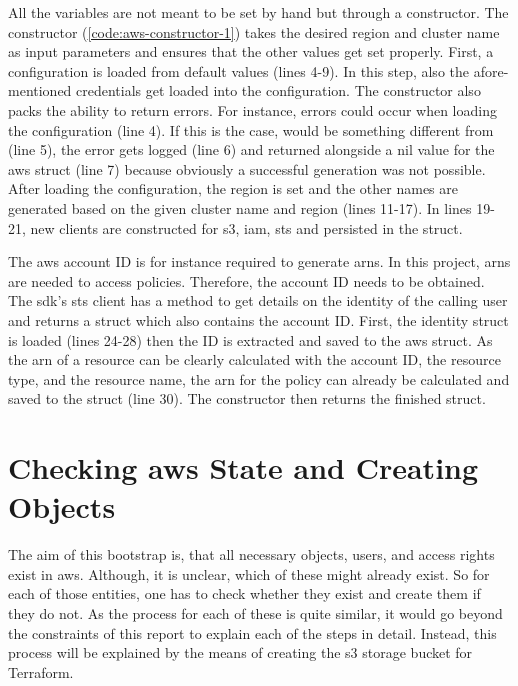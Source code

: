 

All the variables are not meant to be set by hand but through a constructor.
The constructor (\autoref{code:aws-constructor-1}) takes the desired region and cluster name as input parameters and ensures that the other values get set properly.
First, a configuration is loaded from default values (lines 4-9).
In this step, also the afore-mentioned credentials get loaded into the configuration.
The constructor also packs the ability to return errors.
For instance, errors could occur when loading the configuration (line 4).
If this is the case,  would be something different from  (line 5), the error gets logged (line 6) and returned alongside a nil value for the \ac{aws} struct (line 7) because obviously a successful generation was not possible.
After loading the configuration, the region is set and the other names are generated based on the given cluster name and region (lines 11-17).
In lines 19-21, new clients are constructed for \ac{s3}, \ac{iam}, \ac{sts} and persisted in the struct.

The \ac{aws} account ID is for instance required to generate \acp{arn}.
In this project, \acp{arn} are needed to access policies.
Therefore, the account ID needs to be obtained.
The \ac{sdk}'s \ac{sts} client has a method to get details on the identity of the calling user and returns a struct which also contains the account ID.
First, the identity struct is loaded (lines 24-28) then the ID is extracted and saved to the \ac{aws} struct.
As the \ac{arn} of a resource can be clearly calculated with the account ID, the resource type, and the resource name, the \ac{arn} for the policy can already be calculated and saved to the struct (line 30).
The constructor then returns the finished struct.



\section{Checking \ac{aws} State and Creating Objects}
The aim of this bootstrap is, that all necessary objects, users, and access rights exist in \ac{aws}.
Although, it is unclear, which of these might already exist.
So for each of those entities, one has to check whether they exist and create them if they do not.
As the process for each of these is quite similar, it would go beyond the constraints of this report to explain each of the steps in detail.
Instead, this process will be explained by the means of creating the \ac{s3} storage bucket for Terraform.

